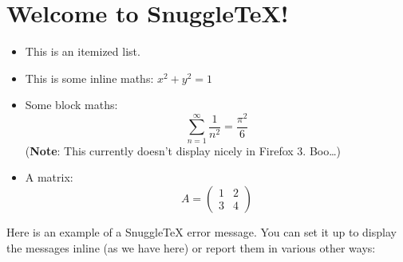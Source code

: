 \section*{Welcome to SnuggleTeX!}

\begin{itemize}
  \item This is an itemized list.

  \item This is some inline maths: $x^2+ y^2 = 1$

  \item Some block maths:
        \[ \sum_{n=1}^\infty \frac{1}{n^2} = \frac{\pi^2}{6} \]
        (\textbf{Note}: This currently doesn't display nicely in Firefox 3. Boo\ldots)

  \item A matrix:
        \[ A = \left( \begin{array}{cc} 1 & 2 \\ 3 & 4 \end{array} \right) \]

\end{itemize}

Here is an example of a SnuggleTeX error message. You can set it up to display the messages inline (as we have here) or report them in various other ways:

\doh
